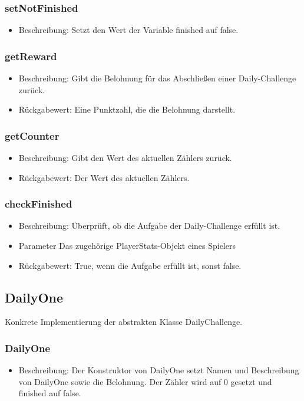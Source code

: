 \documentclass[a4paper]{scrreprt}
\begin{document}
	\subsubsection{setNotFinished}
	\begin{itemize}
		\item Beschreibung: Setzt den Wert der Variable finished auf false.
	\end{itemize}
	\subsubsection{getReward}
	\begin{itemize}
		\item Beschreibung: Gibt die Belohnung für das Abschließen einer Daily-Challenge zurück.
		\item Rückgabewert: Eine Punktzahl, die die Belohnung darstellt.
	\end{itemize}
	\subsubsection{getCounter}
	\begin{itemize}
		\item Beschreibung: Gibt den Wert des aktuellen Zählers zurück.
		\item Rückgabewert: Der Wert des aktuellen Zählers.
	\end{itemize}
	\subsubsection{checkFinished}
	\begin{itemize}
		\item Beschreibung: Überprüft, ob die Aufgabe der Daily-Challenge erfüllt ist.
		\item Parameter Das zugehörige PlayerStats-Objekt eines Spielers
		\item Rückgabewert: True, wenn die Aufgabe erfüllt ist, sonst false.
	\end{itemize}

	\subsection{DailyOne}
	Konkrete Implementierung der abstrakten Klasse DailyChallenge.
	\subsubsection{DailyOne}
	\begin{itemize}
		\item Beschreibung: Der Konstruktor von DailyOne setzt Namen und Beschreibung von DailyOne sowie die Belohnung. Der Zähler wird auf 0 gesetzt und finished auf false.
	\end{itemize}
\end{document}
